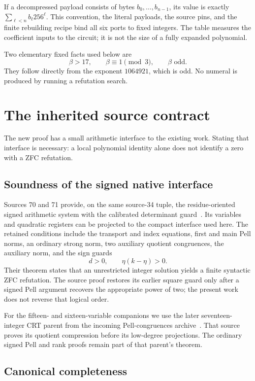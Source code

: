 \documentclass[11pt]{article}
\theoremstyle{definition}
\theoremstyle{remark}
\begin{document}
If a decompressed payload consists of bytes \(b_0,\ldots,b_{n-1}\), its
value is exactly \(\sum_{\ell<n}b_\ell256^\ell\). This convention, the
literal payloads, the source pins, and the finite rebuilding recipe bind
all six ports to fixed integers. The table measures the coefficient
inputs to the circuit; it is not the size of a fully expanded polynomial.

Two elementary fixed facts used below are
\[
 \beta>17,\qquad \beta\equiv1\pmod3,\qquad \beta\text{ odd}.
\]
They follow directly from the exponent \(1064921\), which is odd.
No numeral is produced by running a refutation search.

\section{The inherited source contract}
\label{sec:contract}

The new proof has a small arithmetic interface to the existing work.
Stating that interface is necessary: a local polynomial identity alone
does not identify a zero with a ZFC refutation.

\subsection{Soundness of the signed native interface}

Sources 70 and 71 provide, on the same source-34 tuple, the
residue-oriented signed arithmetic system with the calibrated determinant
guard~\cite{p34,p70,p71}. Its variables and quadratic registers can be
projected to the compact interface used here. The retained conditions
include the transport and index equations, first and main Pell norms,
an ordinary strong norm, two auxiliary quotient congruences, the
auxiliary norm, and the sign guards
\[
 d>0,\qquad \eta(k-\eta)>0.
\]
Their theorem states that an unrestricted integer solution yields a
finite syntactic ZFC refutation. The source proof restores its earlier
square guard only after a signed Pell argument recovers the appropriate
power of two; the present work does not reverse that logical order.

For the fifteen- and sixteen-variable companions we use the later
seventeen-integer CRT parent from the incoming Pell-congruences
archive~\cite{incomingpell}. That source proves its quotient compression
before its low-degree projections. The ordinary signed Pell and rank
proofs remain part of that parent's theorem.

\subsection{Canonical completeness}
\end{document}
